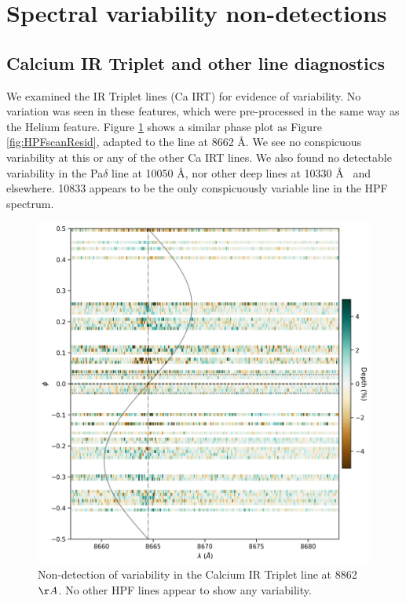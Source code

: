 \documentclass[twocolumn]{aastex631}
\begin{document}
\clearpage
\pagebreak


\appendix

\section{Spectral variability non-detections} \label{appendixSec}
\subsection{Calcium IR Triplet and other line diagnostics}
We examined the  IR Triplet lines (Ca IRT) for evidence of variability.  No variation was seen in these features, which were pre-processed in the same way as the Helium feature.  Figure \ref{fig:CaPhaseScan} shows a similar phase plot as Figure \ref{fig:HPFscanResid}, adapted to the line at 8662 \AA.  We see no conspicuous variability at this or any of the other Ca IRT lines.  We also found no detectable variability in the Pa$\delta$ line at 10050 \AA, nor other deep lines at 10330 \AA~ and elsewhere.   10833 appears to be the only conspicuously variable line in the HPF spectrum.

\begin{figure}[b]
    \includegraphics[width=0.5\linewidth]{figures/Ca8662_phase_2D_diagram_resid.png}
    \caption{Non-detection of variability in the Calcium IR Triplet line at 8862 $\AA$.  No other HPF lines appear to show any variability.}
    \label{fig:CaPhaseScan}
\end{figure}
\end{document}
